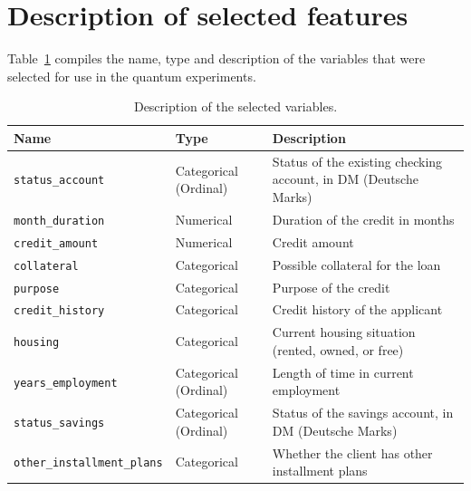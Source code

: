 \documentclass{ieeeaccess}
\begin{document}
\clearpage
\appendices

\renewcommand{\thelemma}{\Alph{section}.\arabic{lemma}}
\renewcommand{\theproposition}{\Alph{section}.\arabic{proposition}}

\section{Description of selected features}
\label{ap:selected_features}

Table~\ref{tab:variables_descriptions} compiles the name, type and description of the variables that were selected for use in the quantum experiments.

\begin{table}[!t]
  \caption{Description of the selected variables.}
  \label{tab:variables_descriptions}
  \centering
  \begin{tabular}{llp{}}
    \toprule
    Name & Type & Description \\
    \midrule
    \texttt{status\_account}           & Categorical (Ordinal)     & Status of the existing checking account, in DM (Deutsche Marks) \\
    \texttt{month\_duration}           & Numerical   & Duration of the credit in months \\
    \texttt{credit\_amount}            & Numerical   & Credit amount \\
    \texttt{collateral}                & Categorical & Possible collateral for the loan \\
    \texttt{purpose}                   & Categorical & Purpose of the credit \\
    \texttt{credit\_history}           & Categorical & Credit history of the applicant \\
    \texttt{housing}                   & Categorical & Current housing situation (rented, owned, or free) \\
    \texttt{years\_employment}         & Categorical (Ordinal)     & Length of time in current employment \\
    \texttt{status\_savings}           & Categorical (Ordinal)     & Status of the savings account, in DM (Deutsche Marks) \\
    \texttt{other\_installment\_plans} & Categorical & Whether the client has other installment plans \\
    \bottomrule
  \end{tabular}
\end{table}
\end{document}
